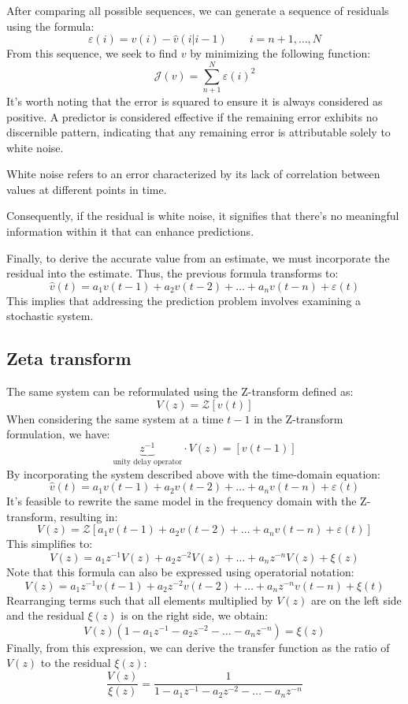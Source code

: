 After comparing all possible sequences, we can generate a sequence of residuals using the formula:
\[\varepsilon(i) = v(i) - \widehat{v}(i | i - 1) \qquad i = n+1,\dots,N\]
From this sequence, we seek to find $v$  by minimizing the following function:
\[\mathcal{J}(v)=\sum_{n+1}^N\varepsilon(i)^2\]
It's worth noting that the error is squared to ensure it is always considered as positive.
A predictor is considered effective if the remaining error exhibits no discernible pattern, indicating that any remaining error is attributable solely to white noise.
\begin{definition}
    White noise refers to an error characterized by its lack of correlation between values at different points in time.
\end{definition}
Consequently, if the residual is white noise, it signifies that there's no meaningful information within it that can enhance predictions.

Finally, to derive the accurate value from an estimate, we must incorporate the residual into the estimate. 
Thus, the previous formula transforms to:
\[\widehat{v}(t)=a_1v(t-1)+a_2v(t-2)+\dots+a_nv(t-n)+\varepsilon(t)\]
This implies that addressing the prediction problem involves examining a stochastic system.

\subsection{Zeta transform}
The same system can be reformulated using the Z-transform defined as:
\[V(z)=\mathcal{Z} \left[v(t)\right]\]
When considering the same system at a time $t-1$ in the Z-transform formulation, we have:
\[\underbrace{z^{-1}}_{\text{unity delay operator}} \cdot V(z) =\left[v(t-1)\right]\]
By incorporating the system described above with the time-domain equation:
\[\widehat{v}(t)=a_1v(t-1)+a_2v(t-2)+\dots+a_nv(t-n)+\varepsilon(t)\]
It's feasible to rewrite the same model in the frequency domain with the Z-transform, resulting in:
\[V(z)=\mathcal{Z}\left[ a_1v(t-1)+a_2v(t-2)+\dots+a_nv(t-n)+\varepsilon(t) \right]\]
This simplifies to:
\[V(z)=a_1z^{-1}V(z)+a_2z^{-2}V(z)+\dots+a_nz^{-n}V(z)+\xi(z) \]
Note that this formula can also be expressed using operatorial notation:
\[V(z)=a_1z^{-1}v(t-1)+a_2z^{-2}v(t-2)+\dots+a_nz^{-n}v(t-n)+\xi(t) \]
Rearranging terms such that all elements multiplied by $V(z)$ are on the left side and the residual $\xi(z)$ is on the right side, we obtain:
\[V(z)\left(1 -a_1z^{-1}-a_2z^{-2}-\dots-a_nz^{-n}\right)=\xi(z) \]
Finally, from this expression, we can derive the transfer function as the ratio of $V(z)$ to the residual $\xi(z)$: 
\[\dfrac{V(z)}{\xi(z)}=\dfrac{1}{1 -a_1z^{-1}-a_2z^{-2}-\dots-a_nz^{-n}}\]

